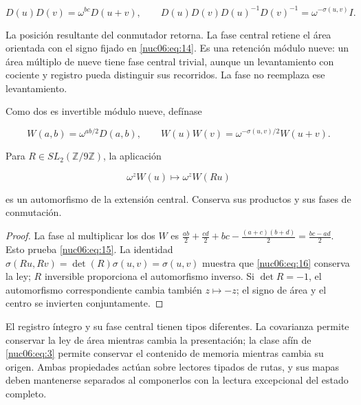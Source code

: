 \begin{equation}
D(u)D(v)=\omega^{bc}D(u+v),\qquad
D(u)D(v)D(u)^{-1}D(v)^{-1}=\omega^{-\sigma(u,v)}I.
\label{nuc06:eq:14}
\end{equation}

La posición resultante del conmutador retorna. La fase central retiene el área orientada con el signo fijado en \eqref{nuc06:eq:14}. Es una retención módulo nueve: un área múltiplo de nueve tiene fase central trivial, aunque un levantamiento con cociente y registro pueda distinguir sus recorridos. La fase no reemplaza ese levantamiento.

\begin{proposition}

Como dos es invertible módulo nueve, defínase

\begin{equation}
W(a,b)=\omega^{ab/2}D(a,b),\qquad
W(u)W(v)=\omega^{-\sigma(u,v)/2}W(u+v).
\label{nuc06:eq:15}
\end{equation}

Para \(R\in SL_2(\mathbb Z/9\mathbb Z)\), la aplicación

\begin{equation}
\omega^zW(u)\longmapsto\omega^zW(Ru)
\label{nuc06:eq:16}
\end{equation}

es un automorfismo de la extensión central. Conserva sus productos y sus fases de conmutación.
\end{proposition}

\begin{proof}
La fase al multiplicar los dos \(W\) es
\(\frac{ab}{2}+\frac{cd}{2}+bc-\frac{(a+c)(b+d)}2=\frac{bc-ad}{2}\). Esto prueba \eqref{nuc06:eq:15}. La identidad \(\sigma(Ru,Rv)=\det(R)\sigma(u,v)=\sigma(u,v)\) muestra que \eqref{nuc06:eq:16} conserva la ley; \(R\) inversible proporciona el automorfismo inverso. Si \(\det R=-1\), el automorfismo correspondiente cambia también \(z\mapsto-z\); el signo de área y el centro se invierten conjuntamente.
\end{proof}

El registro íntegro y su fase central tienen tipos diferentes. La covarianza permite conservar la ley de área mientras cambia la presentación; la clase afín de \eqref{nuc06:eq:3} permite conservar el contenido de memoria mientras cambia su origen. Ambas propiedades actúan sobre lectores tipados de rutas, y sus mapas deben mantenerse separados al componerlos con la lectura excepcional del estado completo.

